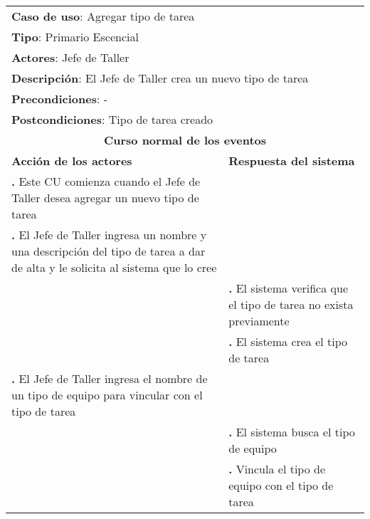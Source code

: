 \documentclass[12pt]{extarticle}
\begin{document}
    \newcommand\inc{\stepcounter{step}\textbf{\thestep. }}
    \newcommand\resetinc{\setcounter{step}{0}}
    \newcommand\raya{\noindent\rule{169mm}{0.8mm}\\}


	\begin{longtable}{ |p{8cm}|p{8cm}| }
		\hline
		\multicolumn{2}{|p{16cm}|}{\textbf{Caso de uso}: Agregar tipo de tarea}\\
		\multicolumn{2}{|p{16cm}|}{\textbf{Tipo}: Primario Escencial}\\
		\multicolumn{2}{|p{16cm}|}{\textbf{Actores}: Jefe de Taller}\\
		\multicolumn{2}{|p{16cm}|}{\textbf{Descripción}: El Jefe de Taller crea un nuevo tipo de tarea}\\
		\multicolumn{2}{|p{16cm}|}{\textbf{Precondiciones}: -}\\
		\multicolumn{2}{|p{16cm}|}{\textbf{Postcondiciones}: Tipo de tarea creado}\\
		\hline
		\multicolumn{2}{|c|}{\textbf{Curso normal de los eventos}}\\
		\hline
		\textbf{Acción de los actores} & \textbf{Respuesta del sistema}\\
		\hline
			\inc Este CU comienza cuando el Jefe de Taller desea agregar un nuevo tipo de tarea & \\
			\hline
            \inc  El Jefe de Taller ingresa un nombre y una descripción del tipo de tarea a dar de alta y le solicita al sistema que lo cree & \\
			\hline
            & \inc El sistema verifica que el tipo de tarea no exista previamente \\
			\hline
			& \inc El sistema crea el tipo de tarea \\
			\hline
			\inc El Jefe de Taller ingresa el nombre de un tipo de equipo para vincular con el tipo de tarea & \\
			\hline
			& \inc El sistema busca el tipo de equipo \\
			\hline
            & \inc Vincula el tipo de equipo con el tipo de tarea \\

\end{longtable}
\end{document}
